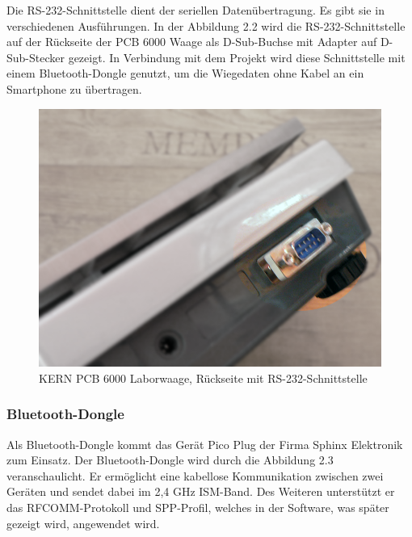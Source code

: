 Die RS-232-Schnittstelle dient der seriellen Daten\"ubertragung. 
Es gibt sie in verschiedenen Ausf\"uhrungen.
In der Abbildung 2.2 wird die RS-232-Schnittstelle auf der R\"uckseite der PCB 6000 Waage als D-Sub-Buchse mit Adapter auf D-Sub-Stecker gezeigt.
In Verbindung mit dem Projekt wird diese Schnittstelle mit einem Bluetooth-Dongle genutzt, 
um die Wiegedaten ohne Kabel an ein Smartphone zu \"ubertragen.\\


\begin{figure}[h]
  \centering
  \includegraphics[scale=0.3]{fotos/devices/KERN_PCB_RS232.png}
  \caption{KERN PCB 6000 Laborwaage, R\"uckseite mit RS-232-Schnittstelle}
 
\end{figure}

\subsubsection{Bluetooth-Dongle}

Als Bluetooth-Dongle kommt das Ger\"at Pico Plug der Firma Sphinx Elektronik zum Einsatz.
Der Bluetooth-Dongle wird durch die Abbildung 2.3 veranschaulicht. 
Er erm\"oglicht eine kabellose Kommunikation zwischen zwei Ger\"aten und sendet dabei im 2,4 GHz ISM-Band.
Des Weiteren unterst\"utzt er das RFCOMM-Protokoll und SPP-Profil, welches in der Software, was sp\"ater gezeigt wird,
angewendet wird.\\

